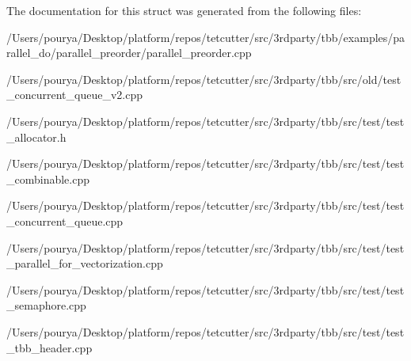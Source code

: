 The documentation for this struct was generated from the following files\+:\begin{DoxyCompactItemize}
\item 
/\+Users/pourya/\+Desktop/platform/repos/tetcutter/src/3rdparty/tbb/examples/parallel\+\_\+do/parallel\+\_\+preorder/parallel\+\_\+preorder.\+cpp\item 
/\+Users/pourya/\+Desktop/platform/repos/tetcutter/src/3rdparty/tbb/src/old/test\+\_\+concurrent\+\_\+queue\+\_\+v2.\+cpp\item 
/\+Users/pourya/\+Desktop/platform/repos/tetcutter/src/3rdparty/tbb/src/test/test\+\_\+allocator.\+h\item 
/\+Users/pourya/\+Desktop/platform/repos/tetcutter/src/3rdparty/tbb/src/test/test\+\_\+combinable.\+cpp\item 
/\+Users/pourya/\+Desktop/platform/repos/tetcutter/src/3rdparty/tbb/src/test/test\+\_\+concurrent\+\_\+queue.\+cpp\item 
/\+Users/pourya/\+Desktop/platform/repos/tetcutter/src/3rdparty/tbb/src/test/test\+\_\+parallel\+\_\+for\+\_\+vectorization.\+cpp\item 
/\+Users/pourya/\+Desktop/platform/repos/tetcutter/src/3rdparty/tbb/src/test/test\+\_\+semaphore.\+cpp\item 
/\+Users/pourya/\+Desktop/platform/repos/tetcutter/src/3rdparty/tbb/src/test/test\+\_\+tbb\+\_\+header.\+cpp\end{DoxyCompactItemize}
